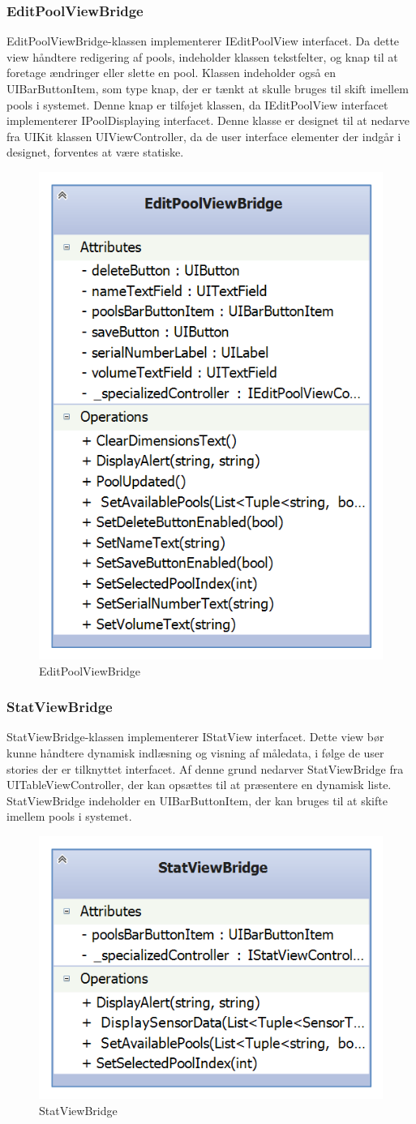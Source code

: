 \subsubsection{EditPoolViewBridge}
EditPoolViewBridge-klassen implementerer IEditPoolView interfacet. Da dette view håndtere redigering af pools, indeholder klassen tekstfelter, og knap til at foretage ændringer eller slette en pool. Klassen indeholder også en UIBarButtonItem, som type knap, der er tænkt at skulle bruges til skift imellem pools i systemet. Denne knap er tilføjet klassen, da IEditPoolView interfacet implementerer IPoolDisplaying interfacet. Denne klasse er designet til at nedarve fra UIKit klassen UIViewController, da de user interface elementer der indgår i designet, forventes at være statiske.

\begin{figure}
	\centering
	\includegraphics[width=0.3\linewidth]{figs/design/ios_editpoolviewbridge}
	\caption{EditPoolViewBridge}
	\label{fig:ios_editpoolviewbridge}
\end{figure}

\subsubsection{StatViewBridge}
StatViewBridge-klassen implementerer IStatView interfacet. Dette view bør kunne håndtere dynamisk indlæsning og visning af måledata, i følge de user stories der er tilknyttet interfacet. Af denne grund nedarver StatViewBridge fra UITableViewController, der kan opsættes til at præsentere en dynamisk liste. StatViewBridge indeholder en UIBarButtonItem, der kan bruges til at skifte imellem pools i systemet.

\begin{figure}
	\centering
	\includegraphics[width=0.3\linewidth]{figs/design/ios_statviewbridge}
	\caption{StatViewBridge}
	\label{fig:ios_statviewbridge}
\end{figure}

